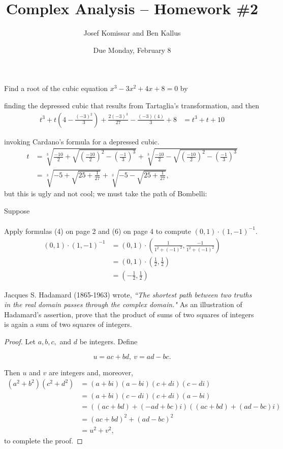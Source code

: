 \documentclass[11pt]{article}       %
\title{Complex Analysis -- Homework \#2}
\author{ Josef Komissar and Ben Kallus }
\date{ Due Monday, February 8 }
\theoremstyle{definition}
\begin{document}
\pagecolor{black}
\color{white}
\maketitle

  Find a root of the cubic equation $x^3-3x^2+4x+8=0$ by

\medskip
{}  finding the depressed cubic that results from Tartaglia's transformation, and then
\begin{align*}
    t^3 + t\left(4 - \frac{(-3)^2}3\right) + \frac{2(-3)^3}{27} - \frac{(-3)(4)}3 + 8 &= t^3 + t + 10
\end{align*}

\medskip
{}  invoking Cardano's formula for a depressed cubic.
\begin{align*}
    t &= \sqrt[3]{\frac{-10}2 + \sqrt{\left(\frac{-10}2\right)^2 - \left(\frac{-1}3\right)^3}} + \sqrt[3]{\frac{-10}2 - \sqrt{\left(\frac{-10}2\right)^2 - \left(\frac{-1}3\right)^3}} \\
    &= \sqrt[3]{-5 + \sqrt{25 +\frac{1}{27}}} + \sqrt[3]{-5 - \sqrt{25 +\frac{1}{27}}},
\end{align*} but this is ugly and not cool; we must take the path of Bombelli:

Suppose 
\begin{align*}
\end{align*}

\bigskip
{}  Apply formulas (4) on page 2 and (6) on page 4 to compute $(0,1) \cdot (1,-1)^{-1}$.
\begin{align*}
    (0,1) \cdot (1,-1)^{-1} &= (0,1) \cdot \left(\frac1{1^2 + (-1)^2},\frac{-1}{1^2 + (-1)^2}\right) \\
                            &= (0,1) \cdot \left(\frac12, \frac12\right) \\
                            &= \left(-\frac12, \frac12\right)
\end{align*}

\newpage
{}  Jacques S. Hadamard (1865-1963) wrote, {\sl ``The shortest path between two truths in the real domain passes through the complex domain."}
As an illustration of Hadamard's assertion,  prove that the product of sums of two squares of integers is again a sum of two squares of integers.

\begin{proof}
Let $a, b, c,$ and $d$ be integers.  Define 

$$u=ac+bd,~v=ad-bc.$$

Then $u$ and $v$ are integers and, moreover,
\begin{align*}
(a^2+b^2)(c^2+d^2) &= (a+bi)(a-bi)(c+di)(c-di) \\
                   &= (a+bi)(c-di)(c+di)(a-bi) \\
                   &= ((ac+bd)+(-ad+bc)i)((ac+bd)+(ad-bc)i) \\
                   &= (ac+bd)^2 + (ad-bc)^2 \\
                   &= u^2 + v^2,
\end{align*} to complete the proof.
\end{proof}
\end{document}
